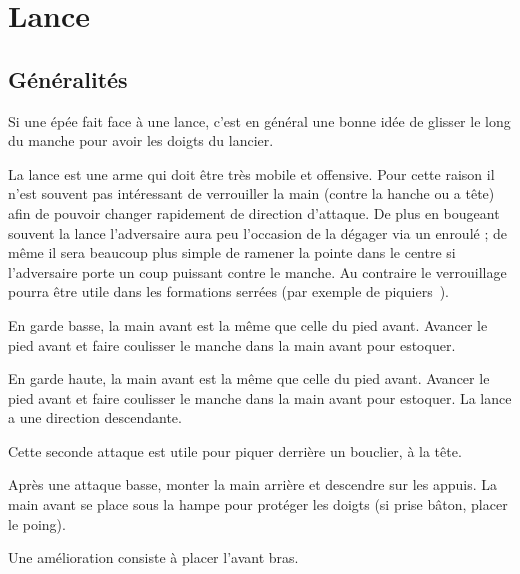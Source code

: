 \chapter{Lance}


\section{Généralités}


Si une épée fait face à une lance, c'est en général une bonne idée de glisser le long du manche pour avoir les doigts du lancier.

La lance est une arme qui doit être très mobile et offensive.
Pour cette raison il n'est souvent pas intéressant de verrouiller la main (contre la hanche ou a tête) afin de pouvoir changer rapidement de direction d'attaque.
De plus en bougeant souvent la lance l'adversaire aura peu l'occasion de la dégager via un enroulé ; de même il sera beaucoup plus simple de ramener la pointe dans le centre si l'adversaire porte un coup puissant contre le manche.
Au contraire le verrouillage pourra être utile dans les formations serrées (par exemple de piquiers~\footnotemark).


\begin{coup}
En garde basse, la main avant est la même que celle du pied avant.
Avancer le pied avant et faire coulisser le manche dans la main avant pour estoquer.
\end{coup}


\begin{coup}
En garde haute, la main avant est la même que celle du pied avant.
Avancer le pied avant et faire coulisser le manche dans la main avant pour estoquer.
La lance a une direction descendante.
\end{coup}

Cette seconde attaque est utile pour piquer derrière un bouclier, à la tête.

\begin{technique}
Après une attaque basse, monter la main arrière et descendre sur les appuis.
La main avant se place sous la hampe pour protéger les doigts (si prise bâton, placer le poing).

Une amélioration consiste à placer l'avant bras.
\end{technique}

